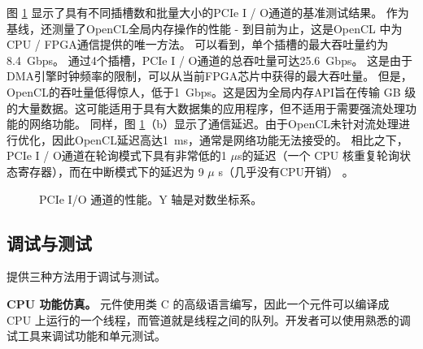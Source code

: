 图 \ref {clicknp:fig:pcie} 显示了具有不同插槽数和批量大小的PCIe I / O通道的基准测试结果。
作为基线，还测量了OpenCL全局内存操作的性能 - 到目前为止，这是OpenCL \cite {opencl}中为CPU / FPGA通信提供的唯一方法。
可以看到，单个插槽的最大吞吐量约为8.4~Gbps。
通过4个插槽，PCIe I / O通道的总吞吐量可达25.6~Gbps。
这是由于DMA引擎时钟频率的限制，可以从当前FPGA芯片中获得的最大吞吐量。
但是，OpenCL的吞吐量低得惊人，低于1~Gbps。这是因为全局内存API旨在传输 GB 级的大量数据。这可能适用于具有大数据集的应用程序，但不适用于需要强流处理功能的网络功能。
同样，图 \ref {clicknp:fig:pcie}（b）显示了通信延迟。由于OpenCL未针对流处理进行优化，因此OpenCL延迟高达1~ms，通常是网络功能无法接受的。
相比之下，PCIe I / O通道在轮询模式下具有非常低的1 $\mu$s的延迟（一个 CPU 核重复轮询状态寄存器），而在中断模式下的延迟为 9 $\mu$ s（几乎没有CPU开销） 。

\begin{figure}[htbp]
	\centering

	\caption{PCIe I/O 通道的性能。Y 轴是对数坐标系。}

	\label{clicknp:fig:pcie}
\end{figure}

\subsection{调试与测试}

\name 提供三种方法用于调试与测试。

\textbf{CPU 功能仿真。}
\name 元件使用类 C 的高级语言编写，因此一个元件可以编译成 CPU 上运行的一个线程，而管道就是线程之间的队列。开发者可以使用熟悉的调试工具来调试功能和单元测试。

